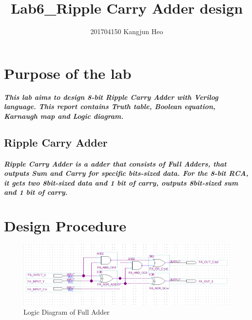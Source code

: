 \documentclass{report}
\title{Lab6\_Ripple Carry Adder design}
\author{201704150 Kangjun Heo}
\begin{document}
    \maketitle
    \tableofcontents

    \chapter{Purpose of the lab}

        \paragraph{This lab aims to design 8-bit Ripple Carry Adder with Verilog language. This report contains Truth table, Boolean equation, Karnaugh map and Logic diagram.}
    
        \section{Ripple Carry Adder}

        \paragraph{\normalfont Ripple Carry Adder is a adder that consists of Full Adders, that outputs Sum and Carry for specific bits-sized data. For the 8-bit RCA, it gets two 8bit-sized data and 1 bit of carry, outputs 8bit-sized sum and 1 bit of carry.}

    \chapter{Design Procedure}

        \begin{figure}[!htb]
            \centering
            \includegraphics[width=\textwidth]{diagrams/full-adder-logic.PNG}
            \caption{Logic Diagram of Full Adder}
        \end{figure}
\end{document}

